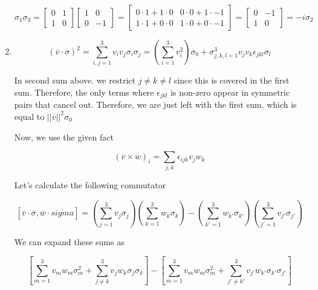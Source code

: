 \documentclass[12pt]{article}
\begin{document}
\begin{enumerate}
\begin{equation}
\sigma_1 \sigma_3 =
\begin{bmatrix}
0 & 1\\
1 & 0
\end{bmatrix}
\begin{bmatrix}
1 & 0\\
0 & -1
\end{bmatrix}
=
\begin{bmatrix}
0\cdot 1 + 1\cdot 0 & 0\cdot 0 + 1\cdot -1\\
1\cdot 1 + 0 \cdot 0 & 1\cdot 0 + 0\cdot -1
\end{bmatrix}
=
\begin{bmatrix}
0 & -1\\
1 & 0
\end{bmatrix}
= -i \sigma_2
\end{equation}

\item
\begin{equation}
(\overline{v}\cdot \overline{\sigma})^2 = \sum_{i,j=1}^3 v_i v_j \sigma_i \sigma_j
= 
\left(\sum_{i=1}^3 v_i^2\right)\sigma_0 + \sigma_{j,k,l=1}^3 v_j v_k \epsilon_{jkl} \sigma_l
\end{equation}

In second sum above. we restrict $j \ne k \ne l$ since this is covered in the
first sum. Therefore, the only terms where $\epsilon_{jkl}$ is non-zero
appear in symmetric pairs that cancel out. Therefore, we are just left
with the first sum, which is equal to $||\overline{v}||^2\sigma_0$

Now, we use the given fact

\begin{equation}
(\overline{v} \times \overline{w})_i = \sum_{j,k} \epsilon_{ijk} v_j w_k
\end{equation}

Let's calculate the following commutator

\begin{equation}
\left[ \overline{v}\cdot \overline{\sigma}, \overline{w} \cdot \overline{sigma} \right]
= \left(\sum_{j=1}^3 v_j \sigma_j \right) \left(\sum_{k=1}^3 w_k \sigma_k \right) -
\left(\sum_{k'=1}^3 w_{k'} \sigma_{k'} \right)\left(\sum_{j'=1}^3 v_{j'} \sigma_{j'} \right)
\end{equation}

We can expand these sums as

\begin{equation}
\left[ \sum_{m=1}^3 v_m w_m \sigma_m^2 + \sum_{j\ne k}^3 v_j w_k \sigma_j \sigma_k \right]
-
\left[ \sum_{m=1}^3 v_m w_m \sigma_m^2 + \sum_{j'\ne k'}^3 v_{j'} w_{k'} \sigma_{k'} \sigma_{j'} \right]
\end{equation}


\end{enumerate}
\end{document}
